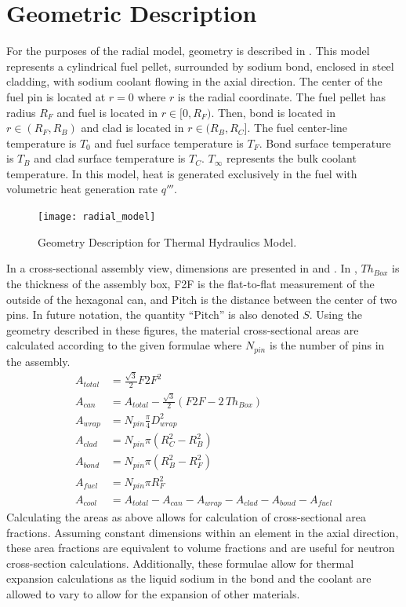 \section{Geometric Description}
  For the purposes of the radial model, geometry is described in
  . This model represents a cylindrical fuel pellet,
  surrounded by sodium bond, enclosed in steel cladding, with sodium coolant
  flowing in the axial direction. The center of the fuel pin is located at
  $r=0$ where $r$ is the radial coordinate. The fuel pellet has radius $R_F$ and
  fuel is located in $r \in [0,R_F)$. Then, bond is located in $r \in (R_F,R_B)$
  and clad is located in $r \in (R_B,R_C]$. The fuel center-line temperature is
  $T_0$ and fuel surface temperature is $T_F$. Bond surface temperature is
  $T_B$ and clad surface temperature is $T_C$. $T_{\infty}$ represents the bulk
  coolant temperature. In this model, heat is generated exclusively in the fuel
  with volumetric heat generation rate $q'''$. 

  \begin{figure}
    \centering
    \texttt{[image: radial\_model]}
    \caption{Geometry Description for Thermal Hydraulics Model.}
    \label{fig:radial_model}
  \end{figure}

  In a cross-sectional assembly view, dimensions are presented in
   and . In , $Th_{Box}$
  is the thickness of the assembly box, F2F is the flat-to-flat measurement of
  the outside of the hexagonal can, and Pitch is the distance between the
  center of two pins. In future notation, the quantity ``Pitch'' is also denoted
  $S$. Using the geometry described in these figures, the material
  cross-sectional areas are calculated according to the given formulae where
  $N_{pin}$ is the number of pins in the assembly.
  \begin{align}
    \label{eq:afrac_first}
    A_{total} &= \frac{\sqrt{3}}{2} F2F^2 \\
    A_{can} &= A_{total} - 
      \frac{\sqrt{3}}{2} \left(  F2F - 2 \, Th_{Box} \right) \\
    A_{wrap} &= N_{pin} \frac{\pi}{4} D_{wrap}^2 \\
    A_{clad} &= N_{pin} \pi (R_C^2 - R_B^2) \\
    A_{bond} &= N_{pin} \pi (R_B^2 - R_F^2) \\
    A_{fuel} &= N_{pin} \pi R_F^2 \\
    \label{eq:afrac_last}
    A_{cool} &= A_{total} - A_{can} - A_{wrap} - A_{clad} - A_{bond} - A_{fuel}
  \end{align}
  Calculating the areas as above allows for calculation of cross-sectional area
  fractions. Assuming constant dimensions within an element in the axial
  direction, these area fractions are equivalent to volume fractions and are
  useful for neutron cross-section calculations. Additionally, these formulae
  allow for thermal expansion calculations as the liquid sodium in the bond and
  the coolant are allowed to vary to allow for the expansion of other materials.

